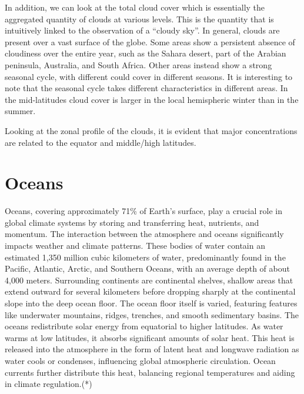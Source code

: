 In addition, we can look at the total cloud cover which is essentially the aggregated quantity of clouds at various levels. This is the quantity that is intuitively linked to the observation of a “cloudy sky”. In general, clouds are present over a vast surface of the globe. Some areas show a persistent absence of cloudiness over the entire year, such as the Sahara desert, part of the Arabian peninsula, Australia, and South Africa. Other areas instead show a strong seasonal cycle, with different could cover in different seasons. It is interesting to note that the seasonal cycle takes different characteristics in different areas. In the mid-latitudes cloud cover is larger in the local hemispheric winter than in the summer.

Looking at the zonal profile of the clouds, it is evident that major concentrations are related to the equator and middle/high latitudes.  



\section{Oceans} 
Oceans, covering approximately 71\% of Earth's surface, play a crucial role in global climate systems by storing and transferring heat, nutrients, and momentum. The interaction between the atmosphere and oceans significantly impacts weather and climate patterns. These bodies of water contain an estimated 1,350 million cubic kilometers of water, predominantly found in the Pacific, Atlantic, Arctic, and Southern Oceans, with an average depth of about 4,000 meters.
\newline Surrounding continents are continental shelves, shallow areas that extend outward for several kilometers before dropping sharply at the continental slope into the deep ocean floor. The ocean floor itself is varied, featuring features like underwater mountains, ridges, trenches, and smooth sedimentary basins.
\newline The oceans redistribute solar energy from equatorial to higher latitudes. As water warms at low latitudes, it absorbs significant amounts of solar heat. This heat is released into the atmosphere in the form of latent heat and longwave radiation as water cools or condenses, influencing global atmospheric circulation. Ocean currents further distribute this heat, balancing regional temperatures and aiding in climate regulation.(*)
